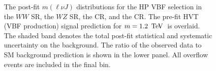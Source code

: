 \begin{figure}[htb]
\caption[Post-fit $m(\ell\nu J)$ distribution for high purity, vector boson fusion selection]{The post-fit $m(\ell\nu J)$ distributions for the HP VBF selection in \protect{} the $WW$ SR, \protect{} the $WZ$ SR, \protect{} the \Wjets CR, and   \protect{} the \ttbar CR. The pre-fit HVT (VBF production) signal prediction for $m=1.2\,\TeV$\, is overlaid. The shaded band denotes the total post-fit statistical and systematic uncertainty on the background. The ratio of the observed data to SM background prediction is shown in the lower panel. All overflow events are included in the final bin. }
\label{fig:pf_hp_vbf}
\end{figure}

\begin{figure}[htb]
\centering
{}
\\

\end{figure}
